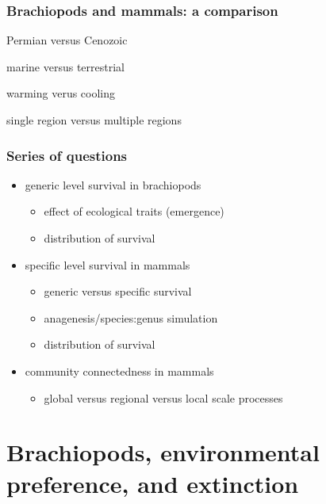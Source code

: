 \documentclass{beamer}
\begin{document}
\begin{frame}
  \frametitle{Brachiopods and mammals: a comparison}

  Permian versus Cenozoic

  marine versus terrestrial

  warming verus cooling

  single region versus multiple regions 
\end{frame}

\begin{frame}
  \frametitle{Series of questions}
  \begin{itemize}
    \item generic level survival in brachiopods %
      \begin{itemize}
        \item effect of ecological traits (emergence)
        \item distribution of survival
      \end{itemize}
    \item specific level survival in mammals
      \begin{itemize}
        \item generic versus specific survival
        \item anagenesis/species:genus simulation
        \item distribution of survival
      \end{itemize}
    \item community connectedness in mammals
      \begin{itemize}
        \item global versus regional versus local scale processes
      \end{itemize}
  \end{itemize}
\end{frame}


\section{Brachiopods, environmental preference, and extinction}
\end{document}
